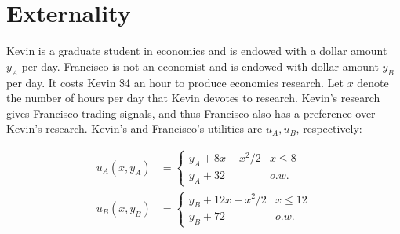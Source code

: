 \documentclass[11pt]{article}
\begin{document}
\section{Externality}

Kevin is a graduate student in economics and is endowed with a dollar amount
$y_A$ per day.  Francisco is not an economist and is endowed with dollar amount
$y_B$ per day. It costs Kevin \$4 an hour to produce economics research. Let $x$
denote the number of hours per day that Kevin devotes to research. Kevin's
research gives Francisco trading signals, and thus Francisco also has a
preference over Kevin's research. Kevin's and Francisco's utilities are $u_A,
u_B$, respectively:

\begin{align*}
  u_A(x, y_A) &= \begin{cases}
  y_A + 8x - x^2/2 & x \le 8 \\
  y_A + 32 & o.w.
\end{cases} \\
  u_B(x, y_B) &= \begin{cases}
  y_B + 12x - x^2/2 & x \le 12 \\
  y_B + 72 & o.w.
\end{cases}
\end{align*}
    
\end{document}
